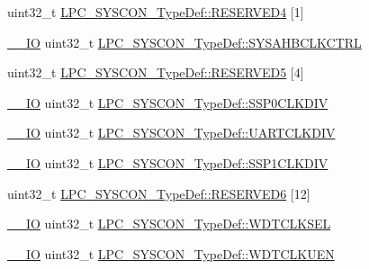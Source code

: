 \begin{DoxyCompactItemize}
\item 
uint32\+\_\+t \hyperlink{group___l_p_c11xx___definitions_gadec0b128a114fba37b3501d88630acd9}{L\+P\+C\+\_\+\+S\+Y\+S\+C\+O\+N\+\_\+\+Type\+Def\+::\+R\+E\+S\+E\+R\+V\+E\+D4} \mbox{[}1\mbox{]}
\item 
\hyperlink{group___c_m_s_i_s__core__definitions_gaec43007d9998a0a0e01faede4133d6be}{\+\_\+\+\_\+\+IO} uint32\+\_\+t \hyperlink{group___l_p_c11xx___definitions_ga19b25dc1da3cf2046edafb388eeab57d}{L\+P\+C\+\_\+\+S\+Y\+S\+C\+O\+N\+\_\+\+Type\+Def\+::\+S\+Y\+S\+A\+H\+B\+C\+L\+K\+C\+T\+RL}
\item 
uint32\+\_\+t \hyperlink{group___l_p_c11xx___definitions_gac85209a97e506caccc4d0fe28f7fc63a}{L\+P\+C\+\_\+\+S\+Y\+S\+C\+O\+N\+\_\+\+Type\+Def\+::\+R\+E\+S\+E\+R\+V\+E\+D5} \mbox{[}4\mbox{]}
\item 
\hyperlink{group___c_m_s_i_s__core__definitions_gaec43007d9998a0a0e01faede4133d6be}{\+\_\+\+\_\+\+IO} uint32\+\_\+t \hyperlink{group___l_p_c11xx___definitions_gac12014d9def35fe72f78e96d151bcd2e}{L\+P\+C\+\_\+\+S\+Y\+S\+C\+O\+N\+\_\+\+Type\+Def\+::\+S\+S\+P0\+C\+L\+K\+D\+IV}
\item 
\hyperlink{group___c_m_s_i_s__core__definitions_gaec43007d9998a0a0e01faede4133d6be}{\+\_\+\+\_\+\+IO} uint32\+\_\+t \hyperlink{group___l_p_c11xx___definitions_ga5246aff7a74ac569d5a25364601e3a62}{L\+P\+C\+\_\+\+S\+Y\+S\+C\+O\+N\+\_\+\+Type\+Def\+::\+U\+A\+R\+T\+C\+L\+K\+D\+IV}
\item 
\hyperlink{group___c_m_s_i_s__core__definitions_gaec43007d9998a0a0e01faede4133d6be}{\+\_\+\+\_\+\+IO} uint32\+\_\+t \hyperlink{group___l_p_c11xx___definitions_ga0b3aeb90b3e045b2bafa727bf55fa4e0}{L\+P\+C\+\_\+\+S\+Y\+S\+C\+O\+N\+\_\+\+Type\+Def\+::\+S\+S\+P1\+C\+L\+K\+D\+IV}
\item 
uint32\+\_\+t \hyperlink{group___l_p_c11xx___definitions_ga57f21d812bc385b1452e4b634910dc96}{L\+P\+C\+\_\+\+S\+Y\+S\+C\+O\+N\+\_\+\+Type\+Def\+::\+R\+E\+S\+E\+R\+V\+E\+D6} \mbox{[}12\mbox{]}
\item 
\hyperlink{group___c_m_s_i_s__core__definitions_gaec43007d9998a0a0e01faede4133d6be}{\+\_\+\+\_\+\+IO} uint32\+\_\+t \hyperlink{group___l_p_c11xx___definitions_gafcb4b4060b3fb896d8932b4709982186}{L\+P\+C\+\_\+\+S\+Y\+S\+C\+O\+N\+\_\+\+Type\+Def\+::\+W\+D\+T\+C\+L\+K\+S\+EL}
\item 
\hyperlink{group___c_m_s_i_s__core__definitions_gaec43007d9998a0a0e01faede4133d6be}{\+\_\+\+\_\+\+IO} uint32\+\_\+t \hyperlink{group___l_p_c11xx___definitions_gafed9dd241501cd76e1f45ef74324a8c6}{L\+P\+C\+\_\+\+S\+Y\+S\+C\+O\+N\+\_\+\+Type\+Def\+::\+W\+D\+T\+C\+L\+K\+U\+EN}

\end{DoxyCompactItemize}
